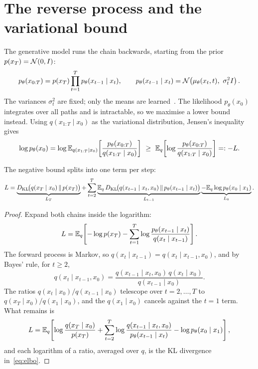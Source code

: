 \section{The reverse process and the variational bound}\label{sec:elbo}
The generative model runs the chain backwards, starting from the prior $p(x_T) = \mathcal{N}(0, I)$:
\begin{equation}\label{eq:reverse}
  p_\theta(x_{0:T}) = p(x_T) \prod_{t=1}^{T} p_\theta(x_{t-1} \mid x_t), \qquad
  p_\theta(x_{t-1} \mid x_t) = \mathcal{N}\!\left(\mu_\theta(x_t, t),\ \sigma_t^2 I\right).
\end{equation}
The variances $\sigma_t^2$ are fixed; only the means are learned~\cite{ho2020}.
The likelihood $p_\theta(x_0)$ integrates over all paths and is intractable, so we maximise a lower bound instead.
Using $q(x_{1:T} \mid x_0)$ as the variational distribution, Jensen's inequality gives
\begin{equation}\label{eq:jensen}
  \log p_\theta(x_0) = \log \mathbb{E}_{q(x_{1:T} \mid x_0)}\!\left[\frac{p_\theta(x_{0:T})}{q(x_{1:T} \mid x_0)}\right]
  \ \ge\ \mathbb{E}_{q}\!\left[\log \frac{p_\theta(x_{0:T})}{q(x_{1:T} \mid x_0)}\right] =: -L .
\end{equation}

\begin{proposition}\label{prop:elbo}
The negative bound splits into one term per step:
\begin{equation}\label{eq:elbo}
  L = \underbrace{D_{\mathrm{KL}}\!\big(q(x_T \mid x_0)\,\|\,p(x_T)\big)}_{L_T}
    + \sum_{t=2}^{T} \underbrace{\mathbb{E}_{q}\,D_{\mathrm{KL}}\!\big(q(x_{t-1} \mid x_t, x_0)\,\|\,p_\theta(x_{t-1} \mid x_t)\big)}_{L_{t-1}}
    \underbrace{-\mathbb{E}_{q} \log p_\theta(x_0 \mid x_1)}_{L_0} .
\end{equation}
\end{proposition}

\begin{proof}
Expand both chains inside the logarithm:
\begin{equation*}
  L = \mathbb{E}_q\!\left[-\log p(x_T) - \sum_{t=1}^{T} \log \frac{p_\theta(x_{t-1} \mid x_t)}{q(x_t \mid x_{t-1})}\right].
\end{equation*}
The forward process is Markov, so $q(x_t \mid x_{t-1}) = q(x_t \mid x_{t-1}, x_0)$, and by Bayes' rule, for $t \ge 2$,
\begin{equation*}
  q(x_t \mid x_{t-1}, x_0) = \frac{q(x_{t-1} \mid x_t, x_0)\, q(x_t \mid x_0)}{q(x_{t-1} \mid x_0)} .
\end{equation*}
The ratios $q(x_t \mid x_0) / q(x_{t-1} \mid x_0)$ telescope over $t = 2, \dots, T$ to $q(x_T \mid x_0) / q(x_1 \mid x_0)$, and the $q(x_1 \mid x_0)$ cancels against the $t = 1$ term. What remains is
\begin{equation*}
  L = \mathbb{E}_q\!\left[\log \frac{q(x_T \mid x_0)}{p(x_T)} + \sum_{t=2}^{T} \log \frac{q(x_{t-1} \mid x_t, x_0)}{p_\theta(x_{t-1} \mid x_t)} - \log p_\theta(x_0 \mid x_1)\right],
\end{equation*}
and each logarithm of a ratio, averaged over $q$, is the KL divergence in~\eqref{eq:elbo}.
\end{proof}

